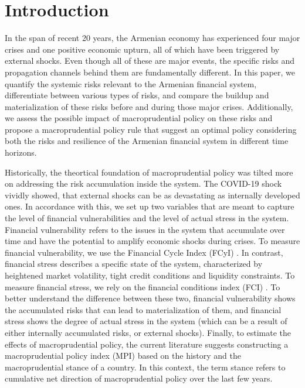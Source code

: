 \documentclass[12pt,a4paper]{article}
\begin{document}
\section{Introduction}
\label{introduction}
In the span of recent 20 years, the Armenian economy has experienced four major crises and one positive economic upturn, all of which have been triggered by external shocks. Even though all of these are major events, the specific risks and propagation channels behind them are fundamentally different. In this paper, we quantify the systemic risks relevant to the Armenian financial system, differentiate between various types of risks, and compare the buildup and materialization of these risks before and during those major crises. Additionally, we assess the possible impact of macroprudential policy on these risks and propose a macroprudential policy rule that suggest an optimal policy considering both the risks and resilience of the Armenian financial system in different time horizons.

Historically, the theortical foundation of macroprudential policy was tilted more on addressing the risk accumulation inside the system. The COVID-19 shock vividly showed, that external shocks can be as devastating as internally developed ones. In accordance with this, we set up two variables that are meant to capture the level of financial vulnerabilities and the level of actual stress in the system. Financial vulnerability refers to the issues in the system that accumulate over time and have the potential to amplify economic shocks during crises. To measure financial vulnerability, we use the Financial Cycle Index (FCyI) \citep{hollo2012, plasil2014}. In contrast, financial stress describes a specific state of the system, characterized by heightened market volatility, tight credit conditions and liquidity constraints. To measure financial stress, we rely on the financial conditions index (FCI) \citep{koop_2013}. To better understand the difference between these two, financial vulnerability shows the accumulated risks that can lead to materialization of them, and financial stress shows the degree of actual stress in the system (which can be a result of either internally accumulated risks, or external shocks). Finally, to estimate the effects of macroprudential policy, the current literature \citep{alam2019, galan2020} suggests constructing a macroprudential policy index (MPI) based on the history and the macroprudential stance of a country. In this context, the term stance refers to cumulative net direction of macroprudential policy over the last few years.
\end{document}
